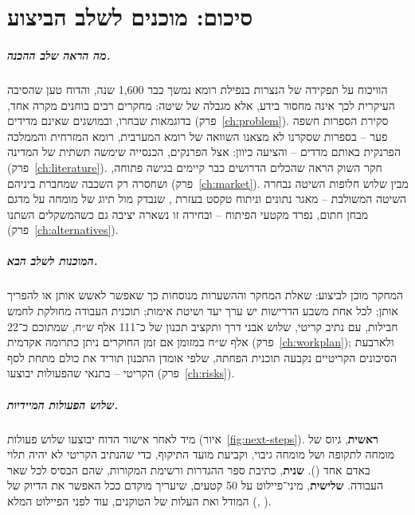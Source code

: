 
\chapter{סיכום: מוכנים לשלב הביצוע}
\label{ch:summary}

\paragraph{מה הראה שלב ההכנה.} הוויכוח על תפקידה של הנצרות בנפילת רומא נמשך כבר 1,600 שנה, והדוח טען שהסיבה העיקרית לכך אינה מחסור בידע, אלא מגבלה של שיטה: מחקרים רבים בוחנים מקרה אחד, בדוגמאות שבחרו, ובמושגים שאינם מדידים (פרק~\ref{ch:problem}). סקירת הספרות חשפה פער – בספרות שסקרנו לא מצאנו השוואה של רומא המערבית, רומא המזרחית והממלכה הפרנקית באותם מדדים – והציעה כיוון: אצל הפרנקים, הכנסייה שימשה תשתית של המדינה (פרק~\ref{ch:literature}). חקר השוק הראה שהכלים הדרושים כבר קיימים בגישה פתוחה, ושחסרה רק השכבה שמחברת ביניהם (פרק~\ref{ch:market}). מבין שלוש חלופות השיטה נבחרה השיטה המשולבת – מאגר נתונים וניתוח טקסט בעזרת , שנבדק מול תיוג של מומחה על מדגם מבחן חתום, נפרד מקטעי הפיתוח – ובחירה זו נשארה יציבה גם כשהמשקלים השתנו (פרק~\ref{ch:alternatives}).

\paragraph{המוכנות לשלב הבא.} המחקר מוכן לביצוע: שאלת המחקר וההשערות מנוסחות כך שאפשר לאשש אותן או להפריך אותן; לכל אחת משבע הדרישות יש ערך יעד ושיטת אימות; תוכנית העבודה מחולקת לחמש חבילות, עם נתיב קריטי, שלוש אבני דרך ותקציב תכנון של כ־111 אלף ש״ח, שמתוכם כ־22 אלף ש״ח במזומן אם זמן החוקרים ניתן כתרומה אקדמית (פרק~\ref{ch:workplan}); ולארבעת הסיכונים הקריטיים נקבעה תוכנית הפחתה, שלפי אומדן התכנון תוריד את כולם מתחת לסף הקריטי – בתנאי שהפעולות יבוצעו (פרק~\ref{ch:risks}).

\paragraph{שלוש הפעולות המיידיות.} מיד לאחר אישור הדוח יבוצעו שלוש פעולות (איור~\ref{fig:next-steps}). \textbf{ראשית}, גיוס של מומחה לתקופה ושל מומחה גיבוי, וקביעת מועד התיקוף, כדי שהנתיב הקריטי לא יהיה תלוי באדם אחד (). \textbf{שנית}, כתיבת ספר ההגדרות ורשימת המקורות, שהם הבסיס לכל שאר העבודה. \textbf{שלישית}, מיני־פיילוט על 50 קטעים, שיעריך מוקדם ככל האפשר את הדיוק של המודל ואת העלות של הטוקנים, עוד לפני הפיילוט המלא (, ).

